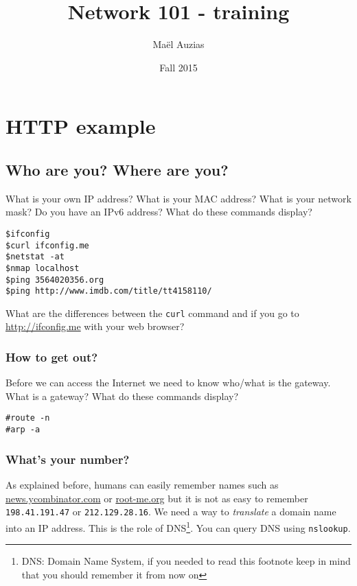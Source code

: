 \documentclass[11pt]{article}
\begin{document}
\title{Network 101 - training}
\date{Fall 2015}
\author{Maël Auzias}
\maketitle



\section{HTTP example}
\subsection{Who are you? Where are you?}
What is your own IP address? What is your MAC address? What is your network mask? Do you have an IPv6 address?
What do these commands display?
\begin{verbatim}
$ifconfig
$curl ifconfig.me
$netstat -at
$nmap localhost
$ping 3564020356.org
$ping http://www.imdb.com/title/tt4158110/
\end{verbatim}
What are the differences between the \verb"curl" command and if you go to \color{blue}\href{http://ifconfig.me}{http://ifconfig.me}\color{black} with your web browser?

\subsubsection{How to get out?}
Before we can access the Internet we need to know who/what is the gateway. What is a gateway?
What do these commands display?
\begin{verbatim}
#route -n
#arp -a
\end{verbatim}

\subsubsection{What's your number?}
As explained before, humans can easily remember names such as \color{blue}\href{https://news.ycombinator.com}{news.ycombinator.com}\color{black} or \color{blue}\href{http://root-me.org}{root-me.org}\color{black} but it is not as easy to remember \verb"198.41.191.47" or \verb"212.129.28.16". We need a way to \emph{translate} a domain name into an IP address. This is the role of DNS\footnote{DNS: Domain Name System, if you needed to read this footnote keep in mind that you should remember it from now on}. You can query DNS using \verb"nslookup".
\end{document}

